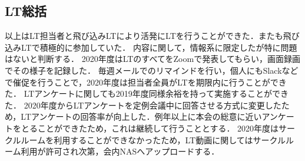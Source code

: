 \subsection*{LT総括}


\secondGrade{}以上はLT担当者と飛び込みLTにより活発にLTを行うことができた．また\firstGrade{}も飛び込みLTで積極的に参加していた．
内容に関して，情報系に限定したが特に問題はないと判断する．
2020年度はLTのすべてをZoomで発表してもらい，画面録画でその様子を記録した．
毎週メールでのリマインドを行い，個人にもSlackなどで催促を行うことで，2020年度は担当者全員がLTを期限内に行うことができた．
LTアンケートに関しても2019年度同様余裕を持って実施することができた．
2020年度からLTアンケートを定例会議中に回答させる方式に変更したため，LTアンケートの回答率が向上した．例年以上に本会の総意に近いアンケートをとることができたため，これは継続して行うこととする．
2020年度はサークルルームを利用することができなかったため，LT動画に関してはサークルルーム利用が許可され次第，会内NASへアップロードする．
